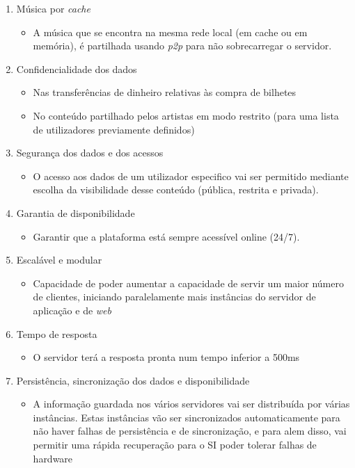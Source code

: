 \documentclass[12pt, a4paper, twoside]{report} %
\begin{document}
\begin{enumerate}
\item Música por \textit{cache}
    \begin{itemize}
    \item A música que se encontra na mesma rede local (em cache ou em memória), é partilhada usando \textit{p2p} para não sobrecarregar o servidor.
    \end{itemize}
\item Confidencialidade dos dados
	\begin{itemize}
	\item Nas transferências de dinheiro relativas às compra de bilhetes
	\item No conteúdo partilhado pelos artistas em modo restrito (para uma lista de utilizadores previamente definidos)
	\end{itemize}
\item Segurança dos dados e dos acessos
	\begin{itemize}
	\item O acesso aos dados de um utilizador especifico vai ser permitido mediante escolha da visibilidade desse conteúdo (pública, restrita e privada).
	\end{itemize}
\item Garantia de disponibilidade
	\begin{itemize}
	\item Garantir que a plataforma está sempre acessível online (24/7).
	\end{itemize}
\item Escalável e modular
	\begin{itemize}
	\item Capacidade de poder aumentar a capacidade de servir um maior número de clientes, iniciando paralelamente mais instâncias do servidor de aplicação e de \textit{web}
	\end{itemize}
\item Tempo de resposta
	\begin{itemize}
	\item O servidor terá a resposta pronta num tempo inferior a 500ms
	\end{itemize}
\item Persistência, sincronização dos dados e disponibilidade
	\begin{itemize}
	\item A informação guardada nos vários servidores vai ser distribuída por várias instâncias. Estas instâncias vão ser sincronizados automaticamente para não haver falhas de persistência e de sincronização, e para alem disso, vai permitir uma rápida recuperação para o SI poder tolerar falhas de hardware

\end{itemize}
\end{enumerate}
\end{document}
